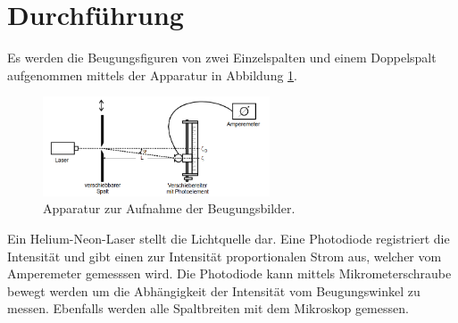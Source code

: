 \section{Durchführung}
\label{sec:Durchführung}
Es werden die Beugungsfiguren von zwei Einzelspalten und einem Doppelspalt aufgenommen mittels der Apparatur
in Abbildung \ref{fig:aufbau}.
\FloatBarrier
\begin{figure}
 \centering
 \includegraphics[width=0.6\textwidth]{aufbau.PNG}
 \caption{Apparatur zur Aufnahme der Beugungsbilder.\cite{sample}}
 \label{fig:aufbau}
\end{figure}
\FloatBarrier
Ein Helium-Neon-Laser stellt die Lichtquelle dar. Eine Photodiode registriert die Intensität und
gibt einen zur Intensität proportionalen Strom aus, welcher vom Amperemeter gemesssen wird.
Die Photodiode kann mittels Mikrometerschraube bewegt werden um die Abhängigkeit der Intensität vom Beugungswinkel
zu messen.
Ebenfalls werden alle Spaltbreiten mit dem Mikroskop gemessen.

